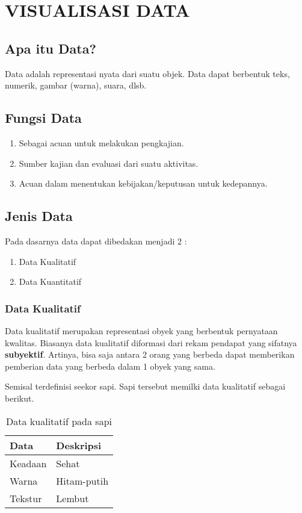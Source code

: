 
\chapter{VISUALISASI DATA}
\section{Apa itu Data?}
Data adalah representasi nyata dari suatu objek. Data dapat berbentuk teks, numerik, gambar (warna), suara, dlsb.

\section{Fungsi Data}
\begin{enumerate}
	\item Sebagai acuan untuk melakukan pengkajian.
	\item Sumber kajian dan evaluasi dari suatu aktivitas.
	\item Acuan dalam menentukan kebijakan/keputusan untuk kedepannya.
\end{enumerate}

\section{Jenis Data}
Pada dasarnya data dapat dibedakan menjadi 2 :
\begin{enumerate}
	\item Data Kualitatif
	\item Data Kuantitatif
\end{enumerate}

\subsection{Data Kualitatif}
Data kualitatif merupakan representasi obyek yang berbentuk pernyataan kwalitas. Biasanya data kualitatif diformasi dari rekam pendapat yang sifatnya \textbf{subyektif}. Artinya, bisa saja antara 2 orang yang berbeda dapat memberikan pemberian data yang berbeda dalam 1 obyek yang sama.

Semisal terdefinisi seekor sapi. Sapi tersebut memilki data kualitatif sebagai berikut.
\begin{table}[hbt!]
  \centering
   \caption{Data kualitatif pada sapi}
   \label{tab:1-1}
  \begin{tabular}{ p{3cm} p{7cm} }
    \hline\hline
    Data & Deskripsi\\
    \hline
    Keadaan & Sehat \\
    Warna & Hitam-putih \\
    Tekstur & Lembut \\
    \hline 
  \end{tabular}
\end{table}

